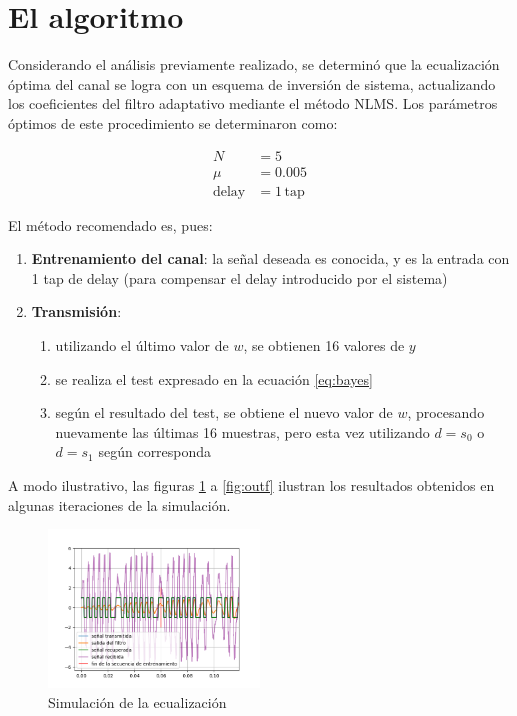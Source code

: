 \documentclass[main.tex]{subfiles}
\begin{document}
\section{El algoritmo}

Considerando el an\'alisis previamente realizado, se determin\'o que la ecualizaci\'on \'optima del canal se logra con un esquema de inversi\'on de sistema, actualizando los coeficientes del filtro adaptativo mediante el m\'etodo NLMS. Los par\'ametros \'optimos de este procedimiento se determinaron como:

\begin{equation}
\begin{aligned}
	N &= 5 \\
	\mu &= 0.005 \\
	\text{delay} &= 1\, \text{tap}
\end{aligned}
\end{equation}

El m\'etodo recomendado es, pues:

\begin{enumerate}
	\item \textbf{Entrenamiento del canal}: la se\~nal deseada es conocida, y es la entrada
	con 1 tap de delay (para compensar el delay introducido por el sistema) 
	\item \textbf{Transmisi\'on}: 
	\begin{enumerate}
		\item utilizando el \'ultimo valor de $w$, se obtienen 16 valores de $y$
		\item se realiza el test expresado en la ecuaci\'on \ref{eq:bayes}
		\item seg\'un el resultado del test, se obtiene el nuevo valor de $w$, procesando
		nuevamente las \'ultimas 16 muestras, pero esta vez utilizando $d=s_0$ o $d=s_1$
		seg\'un corresponda
	\end{enumerate} 
\end{enumerate}

A modo ilustrativo, las figuras \ref{fig:out0} a \ref{fig:outf} ilustran los resultados obtenidos en algunas iteraciones de la simulaci\'on.

\begin{figure}[hp]
	\centering
	\includegraphics[width=0.5\textwidth]{imagenes/out1.png}
	\caption{Simulaci\'on de la ecualizaci\'on}
	\label{fig:out0}
\end{figure}
\end{document}
